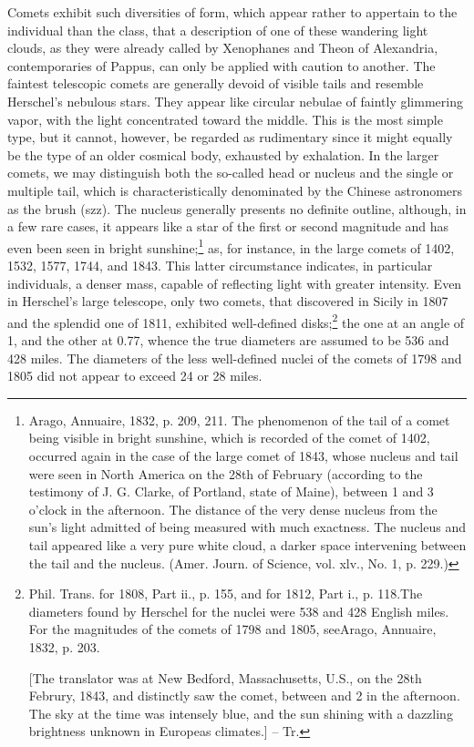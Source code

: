 Comets exhibit such diversities of form, which appear rather to appertain to the individual than the class, that a description of one of these wandering light clouds, as they were already called by Xenophanes and Theon of Alexandria, contemporaries of Pappus, can only be applied with caution to another. The faintest telescopic comets are generally devoid of visible tails and resemble Herschel's nebulous stars. They appear like circular nebulae of faintly glimmering vapor, with the light concentrated toward the middle. This is the most simple type, but it cannot, however, be regarded as rudimentary since it might equally be the type of an older cosmical body, exhausted by exhalation. In the larger comets, we may distinguish both the so-called head or nucleus and the single or multiple tail, which is characteristically denominated by the Chinese astronomers as the brush (szz). The nucleus generally presents no definite outline, although, in a few rare cases, it appears like a star of the first or second magnitude and has even been seen in bright sunshine;\footnote{Arago, Annuaire, 1832, p. 209, 211. The phenomenon of the tail of a comet being visible in bright sunshine, which is recorded of the comet of 1402, occurred again in the case of the large comet of 1843, whose nucleus and tail were seen in North America on the 28th of February (according to the testimony of J. G. Clarke, of Portland, state of Maine), between 1 and 3 o'clock in the afternoon. The distance of the very dense nucleus from the sun's light admitted of being measured with much exactness. The nucleus and tail appeared like a very pure white cloud, a darker space intervening between the tail and the nucleus. (Amer. Journ. of Science, vol. xlv., No. 1, p. 229.)} as, for instance, in the large comets of 1402, 1532, 1577, 1744, and 1843. This latter circumstance indicates, in particular individuals, a denser mass, capable of reflecting light with greater intensity. Even in Herschel's large telescope, only two comets, that discovered in Sicily in 1807 and the splendid one of 1811, exhibited well-defined disks;\footnote{Phil. Trans. for 1808, Part ii., p. 155, and for 1812, Part i., p. 118.The diameters found by Herschel for the nuclei were 538 and 428 English miles. For the magnitudes of the comets of 1798 and 1805, seeArago, Annuaire, 1832, p. 203.

[The translator was at New Bedford, Massachusetts, U.S., on the 28th Februry, 1843, and distinctly saw the comet, between  and 2 in the afternoon. The sky at the time was intensely blue, and the sun shining with a dazzling brightness unknown in Europeas climates.] -- Tr.} the one at an angle of 1, and the other at 0.77, whence the true diameters are assumed to be 536 and 428 miles. The diameters of the less well-defined nuclei of the comets of 1798 and 1805 did not appear to exceed 24 or 28 miles.

